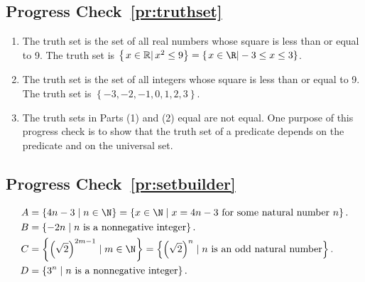 \subsection*{Progress Check~\ref{pr:truthset}}
\begin{enumerate}
\item The truth set is the set of all real numbers whose square is less than or equal to 9. The truth set is  
$\left\{ {\left. {x \in \mathbb{R} } \right| x^2  \leq 9} \right\} = 
\left\{ \left. x \in \R \right| -3 \leq x \leq 3 \right\}$.  

\item The truth set is the set of all integers whose square is less than or equal to 9.  The truth set is
$\left\{ { - 3,  - 2,  - 1, 0, 1, 2, 3} \right\}$.

\item The truth sets in Parts (1) and (2) equal are not equal.  One purpose of this progress check is to show that the truth set of a predicate depends on the predicate and on the universal set.
\end{enumerate}



\subsection*{Progress Check~\ref{pr:setbuilder}}
\begin{align*}
A &=  \left\{ 4n - 3 \mid n \in \N \right\} 
= \left\{ x \in \N \mid x = 4n - 3 \text{ for some natural number } n \right\}. \\
B &=  \left\{ -2n \mid n \text{ is a nonnegative integer} \right\}. \\
C &= \left\{ \left( \sqrt{2} \right)^{2m - 1} \mid m \in \N \right\}
  = \left\{ \left( \sqrt{2} \right)^{n} \mid n \text{ is an odd natural number} \right\}. \\
D &= \left\{ 3^n \mid n \text{ is a nonnegative integer} \right\}.
\end{align*}
\hbreak

\endinput
